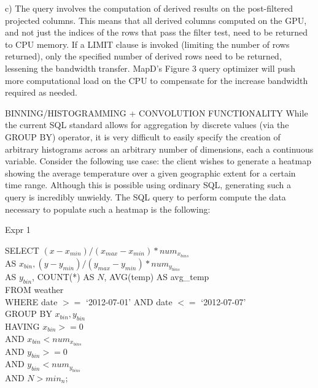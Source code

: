 \documentclass[twocolumn]{article}
\begin{document}
c) The query involves the computation of derived results on the post-filtered projected columns. This means that all derived columns computed on the GPU, and not just the indices of the rows that pass the filter test, need to be returned to CPU memory. If a LIMIT clause is invoked (limiting the number of rows returned), only the specified number of derived rows need to be returned, lessening the bandwidth transfer. MapD’s
Figure 3
query optimizer will push more computational load on the CPU to compensate for the increase bandwidth required as needed.


BINNING/HISTOGRAMMING + CONVOLUTION FUNCTIONALITY
While the current SQL standard allows for aggregation by discrete values (via the GROUP BY) operator, it is very difficult to easily specify the creation of arbitrary histograms across an arbitrary number of dimensions, each a continuous variable. Consider the following use case: the client wishes to generate a heatmap showing the average temperature over a given geographic extent for a certain time range. Although this is possible using ordinary SQL, generating such a query is incredibly unwieldy. The SQL query to perform compute the data necessary to populate such a heatmap is the following:

Expr 1

\noindent
SELECT $(x - x_{min})/(x_{max} - x_{min}) * num_{x_{bins}}$ \\
AS $x_{bin}, (y - y_{min})/(y_{max} - y_{min}) * num_{y_{bins}}$\\ 
AS $y_{bin}$, COUNT(*) AS $N$, AVG(temp) AS avg\_temp \\
FROM weather\\ 
WHERE date $>=$ ‘2012-07-01’ AND date $<=$ ‘2012-07-07’ \\
GROUP BY $x_{bin}, y_{bin}$\\ 
HAVING $x_{bin} >= 0$ \\
AND $x_{bin} < num_{x_{bins}}$\\ 
AND $y_{bin} >= 0$\\ 
AND $y_{bin} < num_{y_{bins}}$\\ 
AND $N > min_n$;\\
\end{document}

